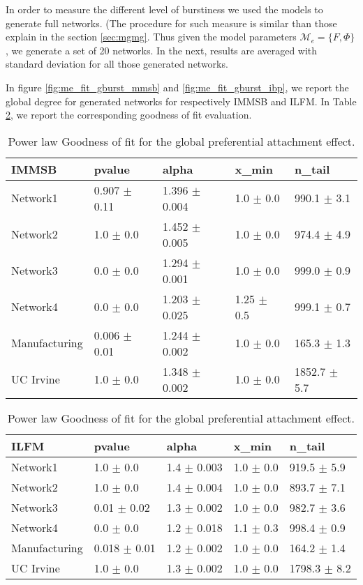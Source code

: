 \documentclass[a4paper, 12pt]{article}
\begin{document}
In order to measure the different level of burstiness we used the models to generate full networks. (The procedure for such measure is similar than those explain in the section \ref{sec:mgmg}. Thus given the model parameters $\mathcal{M}_e = \{F ,\Phi\}$, we generate a set of 20 networks. In the next, results are averaged  with standard deviation for all those generated networks.

In figure \ref{fig:me_fit_gburst_mmsb} and \ref{fig:me_fit_gburst_ibp}, we report the global degree for generated networks for respectively IMMSB and ILFM. In Table \ref{table:global_gof}, we report the corresponding goodness of fit evaluation.





\begin{table}
    \caption{Power law Goodness of fit for the global preferential attachment effect.}
\centering
    \begin{tabular}{lllll}
    \hline
        \textbf{IMMSB} & pvalue          & alpha           & x\_min          & n\_tail           \\
    \hline
    Network1     & 0.907 $\pm$ 0.11 & 1.396 $\pm$ 0.004 & 1.0 $\pm$ 0.0    & 990.1 $\pm$ 3.1  \\
    Network2     & 1.0 $\pm$ 0.0     & 1.452 $\pm$ 0.005 & 1.0 $\pm$ 0.0    & 974.4 $\pm$ 4.9  \\
    Network3     & 0.0 $\pm$ 0.0     & 1.294 $\pm$ 0.001 & 1.0 $\pm$ 0.0    & 999.0 $\pm$ 0.9 \\
    Network4     & 0.0 $\pm$ 0.0     & 1.203 $\pm$ 0.025 & 1.25 $\pm$ 0.5 & 999.1 $\pm$ 0.7 \\
    Manufacturing & 0.006 $\pm$ 0.01 & 1.244 $\pm$ 0.002 & 1.0 $\pm$ 0.0    & 165.3 $\pm$ 1.3 \\
    UC Irvine     & 1.0 $\pm$ 0.0     & 1.348 $\pm$ 0.002 & 1.0 $\pm$ 0.0    & 1852.7 $\pm$ 5.7 \\
    \hline
    \end{tabular}

    \begin{tabular}{lllll}
    \hline
        \textbf{ILFM} & pvalue          & alpha           & x\_min       & n\_tail           \\
    \hline
    Network1     & 1.0 $\pm$ 0.0     & 1.4 $\pm$ 0.003 & 1.0 $\pm$ 0.0 & 919.5 $\pm$ 5.9 \\
    Network2     & 1.0 $\pm$ 0.0     & 1.4 $\pm$ 0.004 & 1.0 $\pm$ 0.0 & 893.7 $\pm$ 7.1  \\
    Network3     & 0.01 $\pm$ 0.02  & 1.3 $\pm$ 0.002 & 1.0 $\pm$ 0.0 & 982.7 $\pm$ 3.6 \\
    Network4     & 0.0 $\pm$ 0.0     & 1.2 $\pm$ 0.018 & 1.1 $\pm$ 0.3 & 998.4 $\pm$ 0.9 \\
    Manufacturing & 0.018 $\pm$ 0.01 & 1.2 $\pm$ 0.002 & 1.0 $\pm$ 0.0 & 164.2 $\pm$ 1.4 \\
    UC Irvine     & 1.0 $\pm$ 0.0     & 1.3 $\pm$ 0.002 & 1.0 $\pm$ 0.0 & 1798.3 $\pm$ 8.2 \\
    \hline
    \end{tabular}
    \label{table:global_gof}
\end{table}
\end{document}
